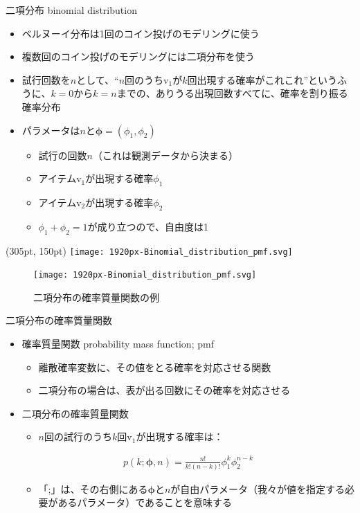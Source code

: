 \documentclass[aspectratio=169,unicode,dvipdfmx,14pt]{beamer}
\begin{document}
\begin{frame}{二項分布 binomial distribution}
\begin{itemize}
\item ベルヌーイ分布は1回のコイン投げのモデリングに使う
\item 複数回のコイン投げのモデリングには二項分布を使う
\item 試行回数を$n$として、``$n$回のうち$\mbox{v}_1$が$k$回出現する確率がこれこれ''というふうに、$k=0$から$k=n$までの、ありうる出現回数すべてに、確率を割り振る確率分布
\item パラメータは$n$と$\bm{\phi} = (\phi_1, \phi_2)$
\begin{itemize}
\item 試行の回数$n$（これは観測データから決まる）
\item アイテム$\mbox{v}_1$が出現する確率$\phi_1$
\item アイテム$\mbox{v}_2$が出現する確率$\phi_2$
\item $\phi_1 + \phi_2=1$が成り立つので、自由度は1
\end{itemize}
\end{itemize}
\begin{textblock*}{0.4\linewidth}(305pt, 150pt)
    \centering
    \texttt{[image: 1920px-Binomial\_distribution\_pmf.svg]}
\end{textblock*}
\end{frame}

\begin{frame}
\begin{figure}[htbp]
\begin{center}
\vspace{.2in}
\texttt{[image: 1920px-Binomial\_distribution\_pmf.svg]}
\caption{二項分布の確率質量関数の例}
\label{}
\end{center}
\end{figure}
\end{frame}

\begin{frame}{二項分布の確率質量関数}
\begin{itemize}
\item 確率質量関数 probability mass function; pmf
\begin{itemize}
\item 離散確率変数に、その値をとる確率を対応させる関数
\item 二項分布の場合は、表が出る回数にその確率を対応させる
\end{itemize}
\item 二項分布の確率質量関数
\begin{itemize}
\item $n$回の試行のうち$k$回$\mbox{v}_1$が出現する確率は：
\end{itemize}
\begin{align}
p(k;\bm{\phi},n)=\frac{n!}{k!(n-k)!}\phi_1^k\phi_2^{n-k}
\end{align}
\begin{itemize}
\item 「;」は、その右側にある$\bm{\phi}$と$n$が自由パラメータ（我々が値を指定する必要があるパラメータ）であることを意味する
\end{itemize}
\end{itemize}
\end{frame}
\end{document}
